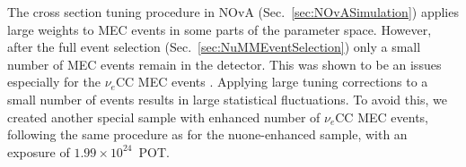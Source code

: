 
The cross section tuning procedure in \gls{NOvA} (Sec.~\ref{sec:NOvASimulation}) applies large weights to \gls{MEC} events in some parts of the parameter space. However, after the full event selection (Sec.~\ref{sec:NuMMEventSelection}) only a small number of \gls{MEC} events remain in the detector. This was shown to be an issues especially for the $\nu_e$\gls{CC} \gls{MEC} events  \cite{NOVA-doc-56383}. Applying large tuning corrections to a small number of events results in large statistical fluctuations. To avoid this, we created another special sample with enhanced number of $\nu_e$\gls{CC} \gls{MEC} events, following the same procedure as for the \gls{nuone}-enhanced sample, with an exposure of $1.99\times10^{24}$~\gls{POT}.



